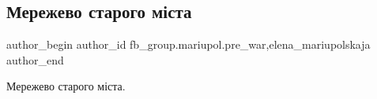  
 
 
 
 

\subsection{Мережево старого міста}
\label{sec:18_02_2023.fb.fb_group.mariupol.pre_war.5.merezhevo_starogo_m_}
 
\ifcmt
 author_begin
   author_id fb_group.mariupol.pre_war,elena_mariupolskaja
 author_end
\fi

Мережево старого міста.

